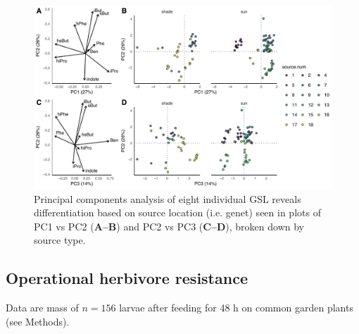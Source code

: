 \documentclass[11pt, oneside]{amsart}
\begin{document}
\vspace{2cm}

\begin{figure}[!hptb]
\centering
\includegraphics[scale=0.75]{gls_PCA}
\caption{Principal components analysis of eight individual GSL reveals differentiation based on source location (i.e. genet) seen in plots of  PC1 vs PC2 (\textbf{A--B}) and PC2 vs PC3 (\textbf{C--D}), broken down by source type. }
\label{FigS10}
\end{figure}


\clearpage


\subsection{Operational herbivore resistance}
Data are mass of $n=156$ larvae after feeding for 48 h on common garden plants (see Methods).

\vspace{2cm}
\end{document}
